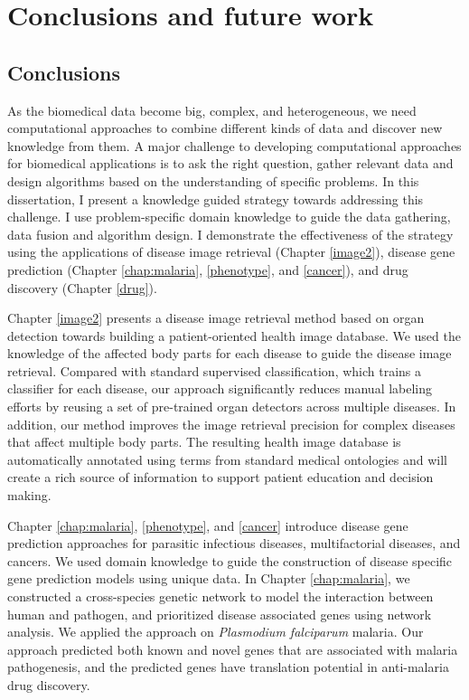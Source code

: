 \chapter{Conclusions and future work}\label{conclusion}
\section{Conclusions}
As the biomedical data become big, complex, and heterogeneous, 
we need computational approaches to combine different kinds of data
and discover new knowledge from them. A major challenge to developing
computational approaches for biomedical applications is to ask the right
question, gather relevant data and design algorithms based on the understanding
of specific problems. In this dissertation, I present
a knowledge guided strategy towards addressing this challenge.
I use problem-specific domain knowledge to guide the data gathering,
data fusion and algorithm design. I demonstrate the effectiveness of the strategy 
using the applications of disease image retrieval (Chapter \ref{image2}), 
disease gene prediction (Chapter \ref{chap:malaria}, \ref{phenotype}, and \ref{cancer}), 
and drug discovery (Chapter \ref{drug}).

Chapter \ref{image2} presents a disease image
retrieval method based on organ detection towards building 
a patient-oriented health image database. We used the knowledge 
of the affected body parts for each disease to guide the disease 
image retrieval. Compared with standard supervised classification,
which trains a classifier for each disease, our approach significantly
reduces manual labeling efforts by reusing a set of pre-trained
organ detectors across multiple diseases. In addition, our method 
improves the image retrieval precision for complex diseases that
affect multiple body parts. The resulting health image database 
is automatically annotated using terms from standard medical 
ontologies and will create a rich source of information to support
patient education and decision making.

Chapter \ref{chap:malaria}, \ref{phenotype}, and \ref{cancer} introduce
disease gene prediction approaches for parasitic infectious diseases,
multifactorial diseases, and cancers. We used domain knowledge to
guide the construction of disease specific gene prediction models using unique data. 
In Chapter \ref{chap:malaria}, 
we constructed a cross-species genetic network to model the interaction
between human and pathogen, and prioritized 
disease associated genes using network analysis.
We applied the approach on {\it Plasmodium falciparum} malaria. 
Our approach predicted both known and novel genes that are 
associated with malaria pathogenesis, and the predicted genes have
translation potential in anti-malaria drug discovery. 

